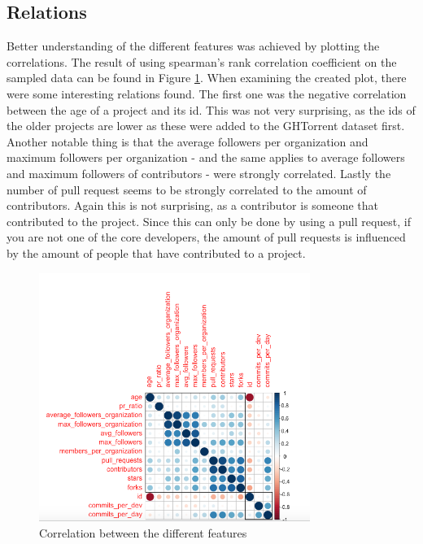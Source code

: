     \subsection{Relations}
    Better understanding of the different features was achieved by plotting the correlations.
    The result of using spearman's rank correlation coefficient \cite{daniel-1990} on the sampled data can be found in Figure \ref{fig:correlation-plot}.
    When examining the created plot, there were some interesting relations found.
    The first one was the negative correlation between the age of a project and its id.
    This was not very surprising, as the ids of the older projects are lower as these were added to the GHTorrent dataset first.
    Another notable thing is that the average followers per organization and maximum followers per organization - and the same applies to average followers and maximum followers of contributors - were strongly correlated. 
    Lastly the number of pull request seems to be strongly correlated to the amount of contributors.
    Again this is not surprising, as a contributor is someone that contributed to the project. 
    Since this can only be done by using a pull request, if you are not one of the core developers, the amount of pull requests is influenced by the amount of people that have contributed to a project.
    \begin{figure}[h!]
	    \includegraphics[width=250pt]{figures/correlation}
	    \caption{Correlation between the different features}
        \label{fig:correlation-plot}
	\end{figure}

